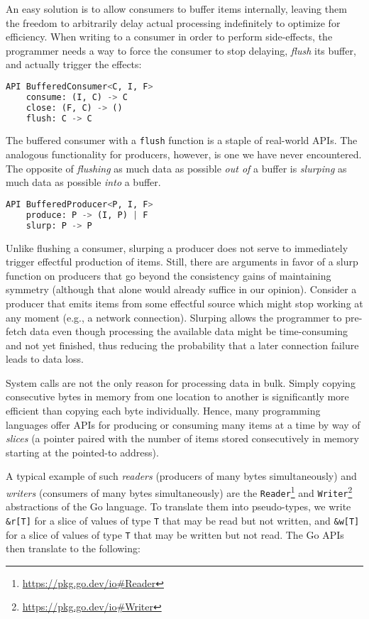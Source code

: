 \documentclass[sigplan,screen,10pt,review]{acmart}
\begin{document}
An easy solution is to allow consumers to buffer items internally, leaving them the freedom to arbitrarily delay actual processing indefinitely to optimize for efficiency. When writing to a consumer in order to perform side-effects, the programmer needs a way to force the consumer to stop delaying, \textit{flush} its buffer, and actually trigger the effects:

\begin{lstlisting}[language=Python]
API BufferedConsumer<C, I, F>
    consume: (I, C) -> C
    close: (F, C) -> ()
    flush: C -> C
\end{lstlisting}

The buffered consumer with a \texttt{flush} function is a staple of real-world APIs. The analogous functionality for producers, however, is one we have never encountered. The opposite of \textit{flushing} as much data as possible \textit{out of} a buffer is \textit{slurping} as much data as possible \textit{into} a buffer.

\begin{lstlisting}[language=Python]
API BufferedProducer<P, I, F>
    produce: P -> (I, P) | F
    slurp: P -> P
\end{lstlisting}

Unlike flushing a consumer, slurping a producer does not serve to immediately trigger effectful production of items. Still, there are arguments in favor of a slurp function on producers that go beyond the consistency gains of maintaining symmetry (although that alone would already suffice in our opinion). Consider a producer that emits items from some effectful source which might stop working at any moment (e.g., a network connection). Slurping allows the programmer to pre-fetch data even though processing the available data might be time-consuming and not yet finished, thus reducing the probability that a later connection failure leads to data loss.

System calls are not the only reason for processing data in bulk. Simply copying consecutive bytes in memory from one location to another is significantly more efficient than copying each byte individually. Hence, many programming languages offer APIs for producing or consuming many items at a time by way of \textit{slices} (a pointer paired with the number of items stored consecutively in memory starting at the pointed-to address).

A typical example of such \textit{readers} (producers of many bytes simultaneously) and \textit{writers} (consumers of many bytes simultaneously) are the \texttt{Reader}\footnote{\url{https://pkg.go.dev/io\#Reader}} and \texttt{Writer}\footnote{\url{https://pkg.go.dev/io\#Writer}} abstractions of the Go language. To translate them into pseudo-types, we write \texttt{\&r[T]} for a slice of values of type \texttt{T} that may be read but not written, and \texttt{\&w[T]} for a slice of values of type \texttt{T} that may be written but not read. The Go APIs then translate to the following:
\end{document}
